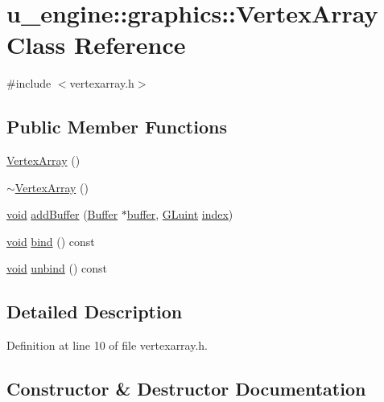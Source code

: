 \hypertarget{classu__engine_1_1graphics_1_1_vertex_array}{}\section{u\+\_\+engine\+:\+:graphics\+:\+:Vertex\+Array Class Reference}
\label{classu__engine_1_1graphics_1_1_vertex_array}


{\ttfamily \#include $<$vertexarray.\+h$>$}

\subsection*{Public Member Functions}
\begin{DoxyCompactItemize}
\item 
\hyperlink{classu__engine_1_1graphics_1_1_vertex_array_afb27a15c9ca228a1efffd73100a92011}{Vertex\+Array} ()
\item 
\hyperlink{classu__engine_1_1graphics_1_1_vertex_array_a225ea943783ebcf85617ae837aaf1759}{$\sim$\+Vertex\+Array} ()
\item 
\hyperlink{wglew_8h_aeea6e3dfae3acf232096f57d2d57f084}{void} \hyperlink{classu__engine_1_1graphics_1_1_vertex_array_ade87d3dbab2b52604a3af2d99f48e43c}{add\+Buffer} (\hyperlink{classu__engine_1_1graphics_1_1_buffer}{Buffer} $\ast$\hyperlink{glew_8h_a6c0f527f003707dfaca177b40f406ed9}{buffer}, \hyperlink{glew_8h_a68c4714e43d8e827d80759f9cb864f3c}{G\+Luint} \hyperlink{glew_8h_a57f14e05b1900f16a2da82ade47d0c6d}{index})
\item 
\hyperlink{wglew_8h_aeea6e3dfae3acf232096f57d2d57f084}{void} \hyperlink{classu__engine_1_1graphics_1_1_vertex_array_a4e89d768beafb3b63802089cee2560e9}{bind} () const 
\item 
\hyperlink{wglew_8h_aeea6e3dfae3acf232096f57d2d57f084}{void} \hyperlink{classu__engine_1_1graphics_1_1_vertex_array_a75b0bba7b3a13e624a9b2656334e8a6a}{unbind} () const 
\end{DoxyCompactItemize}


\subsection{Detailed Description}


Definition at line 10 of file vertexarray.\+h.



\subsection{Constructor \& Destructor Documentation}
\hypertarget{classu__engine_1_1graphics_1_1_vertex_array_afb27a15c9ca228a1efffd73100a92011}{}

